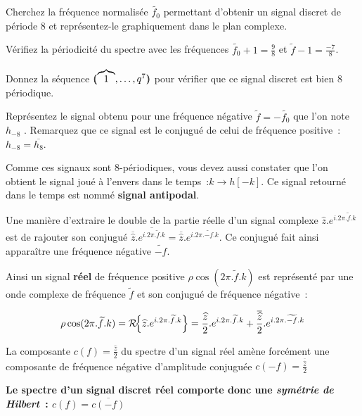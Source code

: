 
Cherchez la fréquence normalisée $\widetilde{f_0}$ permettant d'obtenir un
signal discret de période 8 et représentez-le graphiquement dans le
plan complexe.

Vérifiez la périodicité du spectre avec les fréquences
$\widetilde{f_0}+1=\frac{9}{8}$ et $\widetilde{f}-1=\frac{-7}{8}$.

Donnez la séquence $(\!\!( \overbrace{1}^{},\dots, q^7 )\!\!)$ pour
vérifier que ce signal discret est bien 8 périodique.

Représentez le signal obtenu pour une fréquence négative
$\widetilde{f}=-\widetilde{f_0}$ que l'on note $h_{-8}$ . Remarquez que ce
signal est le conjugué de celui de fréquence positive~:
$h_{-8}=\overline{h_8}$.

Comme ces signaux sont 8-périodiques, vous devez aussi constater que
l'on obtient le signal joué à l'envers dans le temps~:$k\to h[-k]$. Ce
signal retourné dans le temps est nommé \textbf{signal antipodal}.

\begin{remarque}

  Une manière d'extraire le double de la partie réelle d'un signal
  complexe $\widehat{z}.e^{i.2\pi.\widetilde{f}.k}$ est de rajouter son
  conjugué
  $\overline{\widehat{z}}.\overline{e^{i.2\pi.\widetilde{f}.k}} =
  \overline{\widehat{z}}.e^{i.2\pi.\widetilde{-f}.k}$. Ce conjugué fait
  ainsi apparaître une fréquence négative $\widetilde{-f}$.

  Ainsi un signal \textbf{réel} de fréquence positive
  $\rho\cos(2\pi.\widetilde{f}.k)$ est représenté par une onde
  complexe de fréquence $\widetilde{f}$ et son conjugué de fréquence
  négative~:

 $$ \rho\cos(2\pi.\widetilde{f}.k) = \mathcal{R}\!\!\left\{\widehat{z}.e^{i.2\pi.\widetilde{f}.k}\right\} = \frac{\widehat{z}}{2}.e^{i.2\pi.\widetilde{f}.k} + \frac{\overline{\widehat{z}}}{2}.e^{i.2\pi.\widetilde{-f}.k}$$

 La composante $c(f)=\frac{\widehat{z}}{2}$ du spectre d'un signal réel
 amène forcément une composante de fréquence négative d'amplitude
 conjuguée $c(-f)=\frac{\overline{\widehat{z}}}{2}$

 \textbf{Le spectre d'un signal discret réel comporte donc une \emph{symétrie de Hilbert}~: $c(f)=\overline{c(-f)}$}

 \end{remarque}


